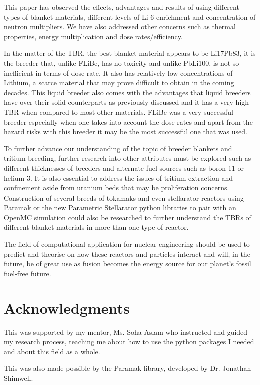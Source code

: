 \documentclass{article}
\begin{document}
This paper has observed the effects, advantages and results of using different types of blanket materials, different levels of Li-6 enrichment and concentration of neutron multipliers. We have also addressed other concerns such as thermal properties, energy multiplication and dose rates/efficiency.

In the matter of the TBR, the best blanket material appears to be Li17Pb83, it is the breeder that, unlike FLiBe, has no toxicity \cite{rh17} and unlike PbLi100, is not so inefficient in terms of dose rate. It also has relatively low concentrations of Lithium, a scarce material that may prove difficult to obtain in the coming decades. This liquid breeder also comes with the advantages that liquid breeders have over their solid counterparts as previously discussed and it has a very high TBR when compared to most other materials. FLiBe was a very successful breeder especially when one takes into account the dose rates and apart from the hazard risks with this breeder it may be the most successful one that was used.

To further advance our understanding of the topic of breeder blankets and tritium breeding, further research into other attributes must be explored such as different thicknesses of breeders and alternate fuel sources such as boron-11 or helium 3. It is also essential to address the issues of tritium extraction and confinement aside from uranium beds that may be proliferation concerns. Construction of several breeds of tokamaks and even stellarator reactors using Paramak or the new Parametric Stellarator python libraries to pair with an OpenMC simulation could also be researched to further understand the TBRs of different blanket materials in more than one type of reactor. 

The field of computational application for nuclear engineering should be used to predict and theorise on how these reactors and particles interact and will, in the future, be of great use as fusion becomes the energy source for our planet’s fossil fuel-free future.

\section*{Acknowledgments}
This was supported by my mentor, Ms. Soha Aslam who instructed and guided my research process, teaching me about how to use the python packages I needed and about this field as a whole.

This was also made possible by the Paramak library, developed by Dr. Jonathan Shimwell.

  
  
\end{document}
